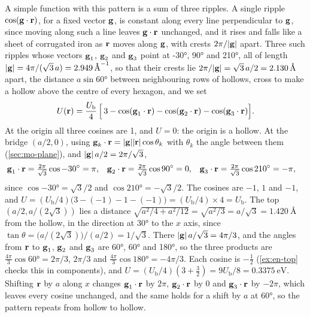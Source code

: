 A simple function with this pattern is a sum of three ripples. A single
ripple $\cos(\bm{\mathrm{g}}\cdot\bm{\mathrm{r}})$, for a fixed vector $\bm{\mathrm{g}}$, is
constant along every line perpendicular to $\bm{\mathrm{g}}$, since moving along
such a line leaves $\bm{\mathrm{g}}\cdot\bm{\mathrm{r}}$ unchanged, and it rises and falls
like a sheet of corrugated iron as $\bm{\mathrm{r}}$ moves along $\bm{\mathrm{g}}$, with
crests $2\pi/\lvert\bm{\mathrm{g}}\rvert$ apart. Three such ripples whose vectors
$\bm{\mathrm{g}}_1$, $\bm{\mathrm{g}}_2$ and $\bm{\mathrm{g}}_3$ point at \ang{-30}, \ang{90} and
\ang{210}, all of length $\lvert\bm{\mathrm{g}}\rvert = 4\pi/(\sqrt3\,a) =
\SI{2.949}{\per\angstrom}$, so that their crests lie $2\pi/\lvert\bm{\mathrm{g}}
\rvert = \sqrt3\,a/2 = \SI{2.130}{\angstrom}$ apart, the distance $a\sin
\ang{60}$ between neighbouring rows of hollows, cross to make a hollow
above the centre of every hexagon, and we set
\begin{equation}
   U(\bm{\mathrm{r}}) = \frac{U_{\mathrm b}}{4}\,\Bigl[\,3 - \cos(\bm{\mathrm{g}}_1\cdot\bm{\mathrm{r}})
   - \cos(\bm{\mathrm{g}}_2\cdot\bm{\mathrm{r}}) - \cos(\bm{\mathrm{g}}_3\cdot\bm{\mathrm{r}})\Bigr] .
   \label{eq:en-surface}
\end{equation}
At the origin all three cosines are 1, and $U = 0$: the origin is a
hollow. At the bridge $(a/2, 0)$, using $\bm{\mathrm{g}}_k\cdot\bm{\mathrm{r}} =
\lvert\bm{\mathrm{g}}\rvert\lvert\bm{\mathrm{r}}\rvert\cos\theta_k$ with $\theta_k$ the
angle between them (\cref{sec:mo-plane}), and $\lvert\bm{\mathrm{g}}\rvert\,a/2 =
2\pi/\sqrt3$,
\begin{align*}
   \bm{\mathrm{g}}_1\cdot\bm{\mathrm{r}} &= \tfrac{2\pi}{\sqrt3}\cos\ang{-30} = \pi , &
   \bm{\mathrm{g}}_2\cdot\bm{\mathrm{r}} &= \tfrac{2\pi}{\sqrt3}\cos\ang{90} = 0 , &
   \bm{\mathrm{g}}_3\cdot\bm{\mathrm{r}} &= \tfrac{2\pi}{\sqrt3}\cos\ang{210} = -\pi ,
\end{align*}
since $\cos\ang{-30} = \sqrt3/2$ and $\cos\ang{210} = -\sqrt3/2$. The
cosines are $-1$, $1$ and $-1$, and $U = (U_{\mathrm b}/4)\bigl(3 - (-1) - 1 -
(-1)\bigr) = (U_{\mathrm b}/4)\times4 = U_{\mathrm b}$. The top $(a/2, a/(2\sqrt3))$
lies a distance $\sqrt{a^2/4 + a^2/12} = \sqrt{a^2/3} = a/\sqrt3 =
\SI{1.420}{\angstrom}$ from the hollow, in the direction at \ang{30} to the
$x$ axis, since $\tan\theta = \bigl(a/(2\sqrt3)\bigr)/(a/2) = 1/\sqrt3$.
There $\lvert\bm{\mathrm{g}}\rvert\,a/\sqrt3 = 4\pi/3$, and the angles from
$\bm{\mathrm{r}}$ to $\bm{\mathrm{g}}_1$, $\bm{\mathrm{g}}_2$ and $\bm{\mathrm{g}}_3$ are \ang{60}, \ang{60}
and \ang{180}, so the three products are $\frac{4\pi}{3}\cos\ang{60} =
2\pi/3$, $2\pi/3$ and $\frac{4\pi}{3}\cos\ang{180} = -4\pi/3$. Each cosine
is $-\frac12$ (\cref{ex:en-top} checks this in components), and $U = (U_{\mathrm b}/4)(3 + \frac32) = 9U_{\mathrm b}/8 =
\SI{0.3375}{\electronvolt}$. Shifting $\bm{\mathrm{r}}$ by $a$ along $x$ changes
$\bm{\mathrm{g}}_1\cdot\bm{\mathrm{r}}$ by $2\pi$, $\bm{\mathrm{g}}_2\cdot\bm{\mathrm{r}}$ by 0 and
$\bm{\mathrm{g}}_3\cdot\bm{\mathrm{r}}$ by $-2\pi$, which leaves every cosine unchanged, and
the same holds for a shift by $a$ at \ang{60}, so the pattern repeats from
hollow to hollow.

